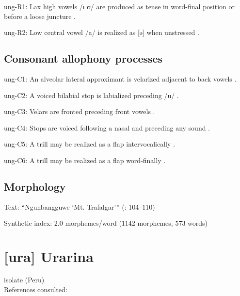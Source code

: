 {\begin{appendixdesc}
\item[ung-R1:] Lax high vowels /ɪ ʊ/ are produced as tense in word-final position or before a loose juncture \citep[13--16]{Rumsey1978}.

\item[ung-R2:] Low central vowel /a/ is realized as [ə] when unstressed \citep[17--18]{Rumsey1978}.
\end{appendixdesc}
\subsection*{Consonant allophony processes}
\begin{appendixdesc}

\item[ung-C1:] An alveolar lateral approximant is velarized adjacent to back vowels \citep[11]{Rumsey1978}.

\item[ung-C2:] A voiced bilabial stop is labialized preceding /u/ \citep[9--10]{Rumsey1978}.

\item[ung-C3:] Velars are fronted preceding front vowels \citep[11]{Rumsey1978}.

\item[ung-C4:] Stops are voiced following a nasal and preceding any sound \citep[9]{Rumsey1978}.

\item[ung-C5:] A trill may be realized as a flap intervocalically \citep[12]{Rumsey1978}.

\item[ung-C6:] A trill may be realized as a flap word-finally \citep[12]{Rumsey1978}.
\end{appendixdesc}
\subsection*{Morphology}

\begin{appendixdesc}

\item[Text:] “Ngunbangguwe ‘Mt. Trafalgar’” (\citealt{CoateOates1970}: 104--110)

\item[Synthetic index:] 2.0 morphemes/word (1142 morphemes, 573 words)
\end{appendixdesc}

\section*{[ura] Urarina}  %
isolate (Peru)\medskip\\
References consulted: \citet{Olawsky2006}

}
